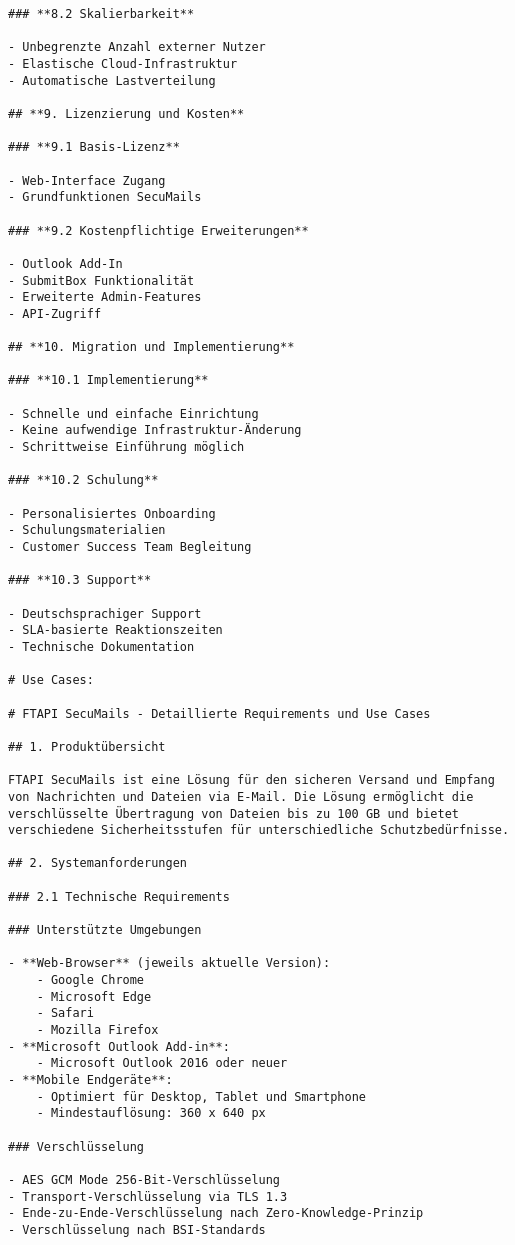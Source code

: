 \begin{Verbatim}[breaklines=true]
### **8.2 Skalierbarkeit**

- Unbegrenzte Anzahl externer Nutzer
- Elastische Cloud-Infrastruktur
- Automatische Lastverteilung

## **9. Lizenzierung und Kosten**

### **9.1 Basis-Lizenz**

- Web-Interface Zugang
- Grundfunktionen SecuMails

### **9.2 Kostenpflichtige Erweiterungen**

- Outlook Add-In
- SubmitBox Funktionalität
- Erweiterte Admin-Features
- API-Zugriff

## **10. Migration und Implementierung**

### **10.1 Implementierung**

- Schnelle und einfache Einrichtung
- Keine aufwendige Infrastruktur-Änderung
- Schrittweise Einführung möglich

### **10.2 Schulung**

- Personalisiertes Onboarding
- Schulungsmaterialien
- Customer Success Team Begleitung

### **10.3 Support**

- Deutschsprachiger Support
- SLA-basierte Reaktionszeiten
- Technische Dokumentation

# Use Cases:

# FTAPI SecuMails - Detaillierte Requirements und Use Cases

## 1. Produktübersicht

FTAPI SecuMails ist eine Lösung für den sicheren Versand und Empfang von Nachrichten und Dateien via E-Mail. Die Lösung ermöglicht die verschlüsselte Übertragung von Dateien bis zu 100 GB und bietet verschiedene Sicherheitsstufen für unterschiedliche Schutzbedürfnisse.

## 2. Systemanforderungen

### 2.1 Technische Requirements

### Unterstützte Umgebungen

- **Web-Browser** (jeweils aktuelle Version):
    - Google Chrome
    - Microsoft Edge
    - Safari
    - Mozilla Firefox
- **Microsoft Outlook Add-in**:
    - Microsoft Outlook 2016 oder neuer
- **Mobile Endgeräte**:
    - Optimiert für Desktop, Tablet und Smartphone
    - Mindestauflösung: 360 x 640 px

### Verschlüsselung

- AES GCM Mode 256-Bit-Verschlüsselung
- Transport-Verschlüsselung via TLS 1.3
- Ende-zu-Ende-Verschlüsselung nach Zero-Knowledge-Prinzip
- Verschlüsselung nach BSI-Standards


\end{Verbatim}
